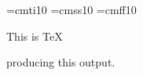 \font\tensl=cmti10
\font\tenss=cmss10
\font\tensf=cmff10
\hsize=6in
\centerline{\tensl This is {\tenss TeX}}
\bigskip
\centerline{\tensf producing this output.}